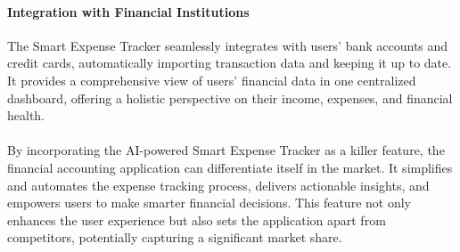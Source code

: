 \paragraph{Integration with Financial Institutions}
The Smart Expense Tracker seamlessly integrates with users' bank accounts and credit cards, automatically importing 
transaction data and keeping it up to date. It provides a comprehensive view of users' financial data in one 
centralized dashboard, offering a holistic perspective on their income, expenses, and financial health.
\\
\\
By incorporating the AI-powered Smart Expense Tracker as a killer feature, the financial accounting application 
can differentiate itself in the market. It simplifies and automates the expense tracking process, delivers actionable 
insights, and empowers users to make smarter financial decisions. This feature not only enhances the user experience 
but also sets the application apart from competitors, potentially capturing a significant market share.
